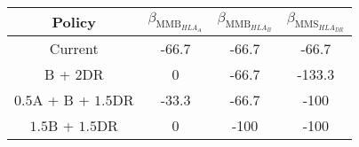 	\begin{tabular}{@{}cccc@{}}
		\toprule
		Policy & $\beta_{\text{MMB}_{HLA_A}}$ &
		$\beta_{\text{MMB}_{HLA_B}}$ & $\beta_{\text{MMS}_{HLA_{DR}}}$ \\
		\midrule
		Current & -66.7     & -66.7     & -66.7\\
		B + 2DR & 0     & -66.7     & -133.3 \\
		$0.5$A + B + $1.5$DR & -33.3 & -66.7     & -100 \\
		$1.5$B + $1.5$DR & 0     & -100     & -100\\
		\bottomrule
	\end{tabular}
